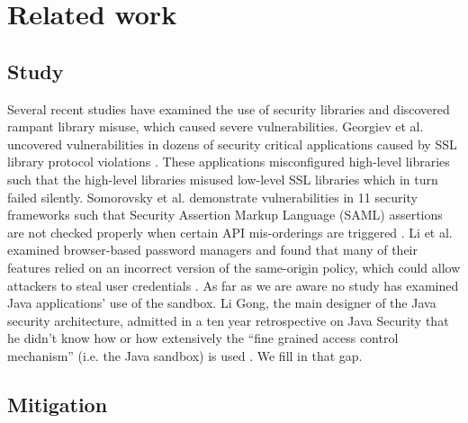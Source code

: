 \documentclass{sig-alternate}
\begin{document}
\section{Related work}
\label{sec:related}

\subsection{Study}

Several recent studies have examined the use of security libraries
and discovered rampant library misuse, which caused severe vulnerabilities.
Georgiev et al. uncovered vulnerabilities in dozens of security critical
applications caused by SSL library protocol violations \cite{georgiev12most-dangerous}.
These applications misconfigured high-level libraries such that the
high-level libraries misused low-level SSL libraries which in turn
failed silently. Somorovsky et al. demonstrate vulnerabilities in
11 security frameworks such that Security Assertion Markup Language
(SAML) assertions are not checked properly when certain API mis-orderings
are triggered \cite{somorovsky12breaking}. Li et al. examined browser-based
password managers and found that many of their features relied on
an incorrect version of the same-origin policy, which could allow
attackers to steal user credentials \cite{li2014emperor}. As far
as we are aware no study has examined Java applications' use of the
sandbox. Li Gong, the main designer of the Java security architecture,
admitted in a ten year retrospective on Java Security that he didn't
know how or how extensively the ``fine grained access control mechanism''
(i.e. the Java sandbox) is used \cite{gong2009java}. We fill in that
gap. 

\subsection{Mitigation}\label{sub:Related-Work-Mitigation}
\end{document}
